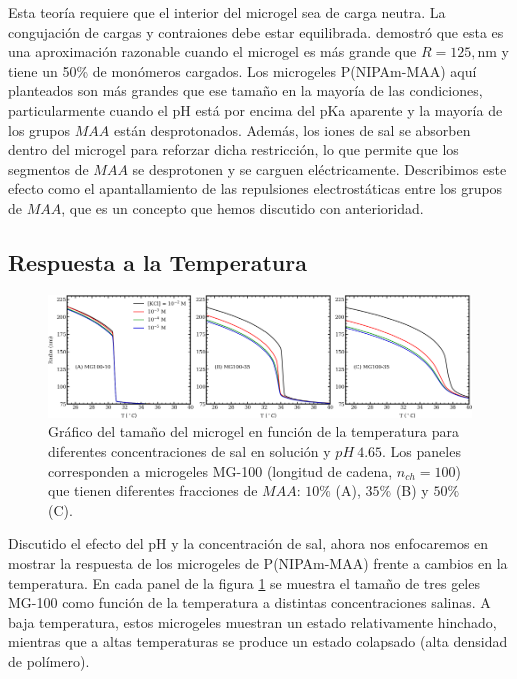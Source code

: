 Esta teor\'ia requiere que el interior del microgel sea de carga neutra. La congujaci\'on de cargas y contraiones debe estar equilibrada. \citet{Claudio2009} demostr\'o que esta es una aproximaci\'on razonable cuando el microgel es m\'as grande que $R = 125,\text{nm}$ y tiene un 50\% de mon\'omeros cargados. Los microgeles P(NIPAm-MAA) aqu\'i planteados son m\'as grandes que ese tama\~no en la mayor\'ia de las condiciones, particularmente cuando el pH est\'a por encima del pKa aparente y la mayor\'ia de los grupos $MAA$ est\'an desprotonados. Adem\'as, los iones de sal se absorben dentro del microgel para reforzar dicha restricci\'on, lo que permite que los segmentos de $MAA$ se desprotonen y se carguen el\'ectricamente. Describimos este efecto como el apantallamiento de las repulsiones electrost\'aticas entre los grupos de $MAA$, que es un concepto que hemos discutido con anterioridad.


\subsection{Respuesta a la Temperatura}\label{sec:gel:temperature}

\begin{figure}[!htb]
	\centering
	\includegraphics[width=0.99\linewidth]{Figures/graph-gel/R-T.pdf}
	\caption{Gr\'afico del tama\~no del microgel en funci\'on de la temperatura para diferentes concentraciones de sal en soluci\'on y $pH~4.65$.
		Los paneles corresponden a microgeles MG-100 (longitud de cadena, $n_{ch}=100$) que tienen diferentes fracciones de $MAA$: $10\%$ (A), $35\%$ (B) y $50\%$ (C).}
	\label{fig:gel:R-T}
\end{figure}

Discutido el efecto del pH y la concentraci\'on de sal, ahora nos enfocaremos en mostrar la respuesta de los microgeles de P(NIPAm-MAA) frente a cambios en la temperatura.
En cada panel de la figura \ref{fig:gel:R-T} se muestra el tama\~no de tres geles MG-100 como funci\'on de la temperatura a distintas concentraciones salinas.
A baja temperatura, estos microgeles muestran un estado relativamente hinchado, mientras que a altas temperaturas se produce un estado colapsado (alta densidad de pol\'imero).

